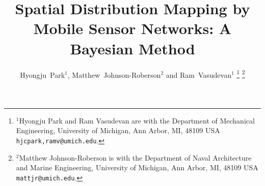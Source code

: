 \documentclass[letterpaper, 10 pt, conference]{ieeeconf}
\begin{document}
	
	

%
\title{\LARGE \bf
	 Spatial Distribution Mapping by Mobile Sensor Networks: A Bayesian Method
}
%
%
%

\author{Hyongju~Park${}^1$, Matthew~Johnson-Roberson${}^2$ and Ram~Vasudevan${}^1$
\thanks{${}^1$Hyongju Park and Ram Vasudevan are with the Department
	of Mechanical Engineering, University of Michigan, Ann Arbor,
	MI, 48109 USA {\tt\small hjcpark,ramv@umich.edu}.}%
\thanks{${}^2$Matthew Johnson-Roberson is with the Department of Naval Architecture and Marine Engineering, University of Michigan, Ann Arbor,
	MI, 48109 USA {\tt\small mattjr@umich.edu}.}%
}%





% 
%
\end{document}
